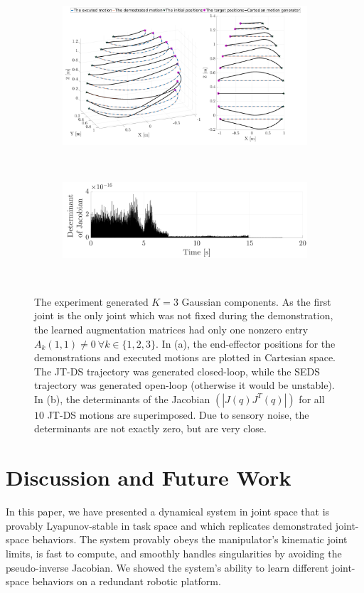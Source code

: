 \documentclass[letterpaper, 10 pt, conference,fleqn]{ieeeconf}
\begin{document}
\begin{figure}[h]
	\begin{subfigure}[t]{\linewidth}
		\includegraphics[width=\linewidth]{Pic/cropped_Sing_1.pdf}
		\caption{ }
		\label{fig:Sin}
	\end{subfigure}\\
	\begin{subfigure}[t]{\linewidth}
		\includegraphics[width=\linewidth]{Pic/cropped_Sing_2.pdf}
		\caption{ }
		\label{fig:Det}
	\end{subfigure}\\
	\caption{The experiment generated $K=3$ Gaussian components. As the first joint is the only joint which was not fixed during the demonstration, the learned augmentation matrices had only one nonzero entry $A_k(1,1)\neq0~\forall k\in \{1, 2, 3\} $.  In (a), the end-effector positions for the demonstrations and executed motions are plotted in Cartesian space. The JT-DS trajectory was generated closed-loop, while the SEDS trajectory was generated open-loop (otherwise it would be unstable). In (b), the determinants of the Jacobian $(|J(q)J^T(q)|)$ for all $10$ JT-DS motions are superimposed. Due to sensory noise, the determinants are not exactly zero, but are very close.  }
	\vspace{-20pt}
\end{figure}

\section{Discussion and Future Work} 
\label{Sec:Dis}
In this paper, we have presented a dynamical system in joint space that is provably Lyapunov-stable in task space and which replicates demonstrated joint-space behaviors. The system provably obeys the manipulator's kinematic joint limits, is fast to compute, and smoothly handles singularities by avoiding the pseudo-inverse Jacobian. We showed the system's ability to learn different joint-space behaviors on a redundant robotic platform.
\end{document}
